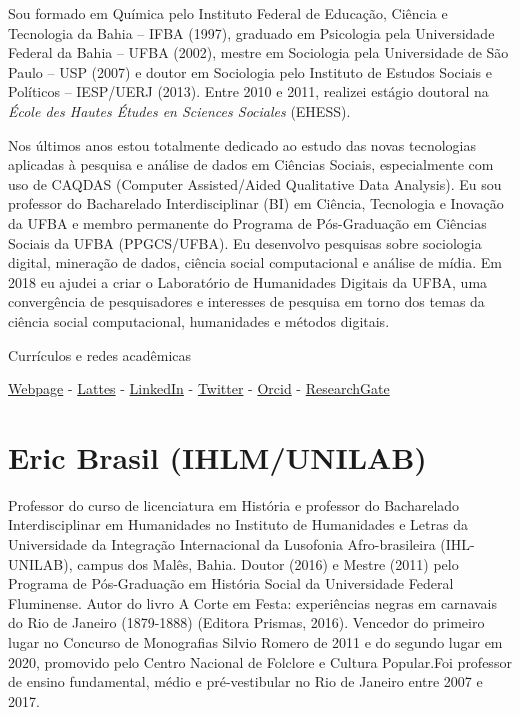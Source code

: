 \documentclass[
]{book}
\begin{document}
Sou formado em Química pelo Instituto Federal de Educação, Ciência e Tecnologia da Bahia -- IFBA (1997), graduado em Psicologia pela Universidade Federal da Bahia -- UFBA (2002), mestre em Sociologia pela Universidade de São Paulo -- USP (2007) e doutor em Sociologia pelo Instituto de Estudos Sociais e Políticos -- IESP/UERJ (2013). Entre 2010 e 2011, realizei estágio doutoral na \emph{École des Hautes Études en Sciences Sociales} (EHESS).

Nos últimos anos estou totalmente dedicado ao estudo das novas tecnologias aplicadas à pesquisa e análise de dados em Ciências Sociais, especialmente com uso de CAQDAS (Computer Assisted/Aided Qualitative Data Analysis). Eu sou professor do Bacharelado Interdisciplinar (BI) em Ciência, Tecnologia e Inovação da UFBA e membro permanente do Programa de Pós-Graduação em Ciências Sociais da UFBA (PPGCS/UFBA). Eu desenvolvo pesquisas sobre sociologia digital, mineração de dados, ciência social computacional e análise de mídia. Em 2018 eu ajudei a criar o Laboratório de Humanidades Digitais da UFBA, uma convergência de pesquisadores e interesses de pesquisa em torno dos temas da ciência social computacional,
humanidades e métodos digitais.

Currículos e redes acadêmicas

\href{https://leofn.com/}{Webpage} -
\href{http://lattes.cnpq.br/7141811368487014}{Lattes} - \href{https://www.linkedin.com/in/leonardo-nascimento-labhdufba/}{LinkedIn} - \href{https://twitter.com/leofn3}{Twitter} -
\href{https://orcid.org/0000-0003-2929-1115}{Orcid} - \href{https://www.researchgate.net/profile/Leonardo-Nascimento-2}{ResearchGate}

\hypertarget{eric-brasil-ihlmunilab}{%
\section{Eric Brasil (IHLM/UNILAB)}\label{eric-brasil-ihlmunilab}}

Professor do curso de licenciatura em História e professor do Bacharelado Interdisciplinar em Humanidades no Instituto de Humanidades e Letras da Universidade da Integração Internacional da Lusofonia Afro-brasileira (IHL-UNILAB), campus dos Malês, Bahia. Doutor (2016) e Mestre (2011) pelo Programa de Pós-Graduação em História Social da Universidade Federal Fluminense. Autor do livro A Corte em Festa: experiências negras em carnavais do Rio de Janeiro (1879-1888) (Editora Prismas, 2016). Vencedor do primeiro lugar no Concurso de Monografias Silvio Romero de 2011 e do segundo lugar em 2020, promovido pelo Centro Nacional de Folclore e Cultura Popular.Foi professor de ensino fundamental, médio e pré-vestibular no Rio de Janeiro entre 2007 e 2017.
\end{document}
